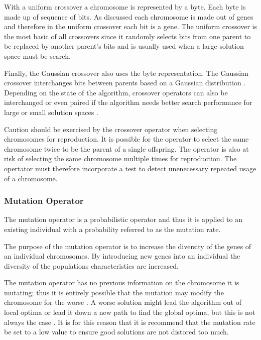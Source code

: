 With a uniform crossover a chromosome is represented by a byte\cite{CompuIntelligenceIntro}. Each byte is made up of sequence of bits. As discussed each chromosome is made out of genes and therefore in the uniform crossover each bit is a gene\cite{CompuIntelligenceIntro}. The uniform crossover is the most basic of all crossovers since it randomly selects bits from one parent to be replaced by another parent's bits and is usually used when a large solution space must be search\cite{ParallelGASA,GeostatisticalGA}. 

Finally, the Gaussian crossover also uses the byte representation. The Gaussian crossover interchanges bits between parents based on a Gaussian distribution \cite{ParallelGASA,GeostatisticalGA}. Depending on the state of the algorithm, crossover operators can also be interchanged or even paired if the algorithm needs better search performance for large or small solution spaces \cite{HetergeneousGA,ParallelGASA}.

Caution should be exercised by the crossover operator when selecting chromosomes for reproduction. It is possible for the operator to select the same chromosome twice to be the parent of a single offspring\cite{CompuIntelligenceIntro}. The operator is also at risk of selecting the same chromosome multiple times for reproduction\cite{CompuIntelligenceIntro}. The opertator must therefore incorporate a test to detect unenecessary repeated usage of a chromosome\cite{CompuIntelligenceIntro}.

\subsubsection{Mutation Operator}
The mutation operator is a probabilistic operator and thus it is applied to an existing individual with a probability referred to as the mutation rate\cite{CompuIntelligenceIntro}. 

The purpose of the mutation operator is to increase the diversity of the genes of an individual chromosomes\cite{CompuIntelligenceIntro}. By introducing new genes into an individual the diversity of the populations characteristics are increased\cite{CoactiveFuzzyGA,AcceleratingGA,ConstrainedGA}.

The mutation operator has no previous information on the chromosome it is mutating; thus it is entirely possible that the mutation may modify the chromosome for the worse \cite{AcceleratingGA}. A worse solution might lead the algorithm out of local optima or lead it down a new path to find the global optima, but this is not always the case \cite{AdaptiveSAGA,FamilyGA,ConstrainedGA}. It is for this reason that it is recommend that the mutation rate be set to a low value to ensure good solutions are not distored too much\cite{CompuIntelligenceIntro}.

